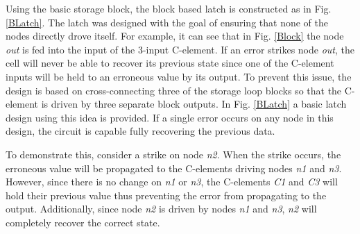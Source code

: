 Using the basic storage block, the block based latch is constructed as in Fig. \ref{BLatch}. The latch was designed with the goal of ensuring that none of the nodes directly drove itself. For example, it can see that in Fig. \ref{Block} the node \textit{out} is fed into the input of the 3-input C-element. If an error strikes node \textit{out}, the cell will never be able to recover its previous state since one of the C-element inputs will be held to an erroneous value by its output. To prevent this issue, the design is based on cross-connecting three of the storage loop blocks so that the C-element is driven by three separate block outputs. In Fig. \ref{BLatch} a basic latch design using this idea is provided. If a single error occurs on any node in this design, the circuit is capable fully recovering the previous data. 

To demonstrate this, consider a strike on node \textit{n2}. When the strike occurs, the erroneous value will be propagated to the C-elements driving nodes \textit{n1} and \textit{n3}. However, since there is no change on \textit{n1} or \textit{n3}, the C-elements \textit{C1} and \textit{C3} will hold their previous value thus preventing the error from propagating to the output. Additionally, since node \textit{n2} is driven by nodes \textit{n1} and \textit{n3}, \textit{n2} will completely recover the correct state. 

